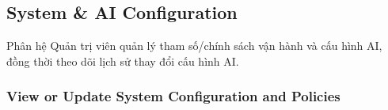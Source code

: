 \documentclass[12pt,a4paper,oneside]{report}
\begin{document}

\subsection{System \& AI Configuration}
\label{subsec:system-ai-configuration}

Phân hệ Quản trị viên quản lý tham số/chính sách vận hành và cấu hình AI, đồng thời theo dõi lịch sử thay đổi cấu hình AI.

\subsubsection{View or Update System Configuration and Policies}
\label{subsubsec:system-configuration-policies}
\end{document}
